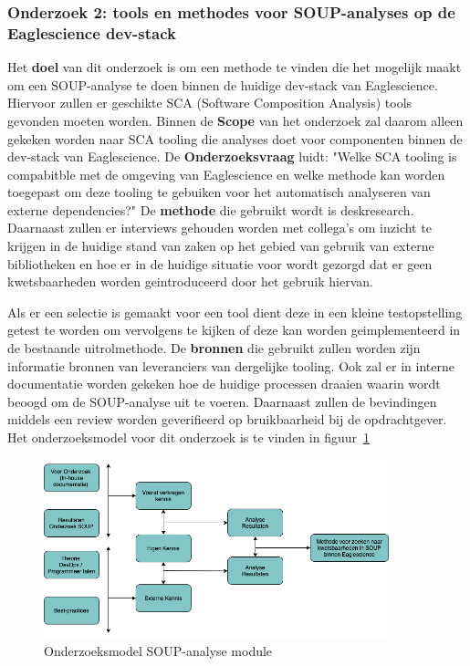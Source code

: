 \subsubsection{Onderzoek 2: tools en methodes voor SOUP-analyses op de Eaglescience dev-stack}
Het \textbf{doel} van dit onderzoek is om een methode te vinden die het mogelijk maakt om een SOUP-analyse te doen binnen de huidige dev-stack van Eaglescience. Hiervoor zullen er geschikte SCA (Software Composition Analysis) tools gevonden moeten worden.
Binnen de \textbf{Scope} van het onderzoek zal daarom alleen gekeken worden naar SCA tooling die analyses doet voor componenten binnen de dev-stack van Eaglescience.
De \textbf{Onderzoeksvraag} luidt: "Welke SCA tooling is compabitble met de omgeving van Eaglescience en welke methode kan worden toegepast om deze tooling te gebuiken voor het automatisch analyseren van externe dependencies?"
De \textbf{methode} die gebruikt wordt is deskresearch. Daarnaast zullen er interviews gehouden worden met collega's om inzicht te krijgen in de huidige stand van zaken op het gebied van gebruik van externe bibliotheken en hoe er in de huidige situatie voor wordt gezorgd dat er geen kwetsbaarheden worden geintroduceerd door het gebruik hiervan.

Als er een selectie is gemaakt voor een tool dient deze in een kleine testopstelling getest te worden om vervolgens te kijken of deze kan worden geimplementeerd in de bestaande uitrolmethode. De \textbf{bronnen} die gebruikt zullen worden zijn informatie bronnen van leveranciers van dergelijke tooling. Ook zal er in interne documentatie worden gekeken hoe de huidige processen draaien waarin wordt beoogd om de SOUP-analyse uit te voeren. Daarnaast zullen de bevindingen middels een review worden geverifieerd op bruikbaarheid bij de opdrachtgever. Het onderzoeksmodel voor dit onderzoek is te vinden in figuur~\ref{fig:OnderzoeksModelSOUPmethode}

\begin{figure}[htbp]
    \myfloatalign
    \includegraphics[width=10cm]{gfx/OnderzoeksModelSOUPMethode}
    \caption{Onderzoeksmodel SOUP-analyse module}
    \label{fig:OnderzoeksModelSOUPmethode}
\end{figure}

